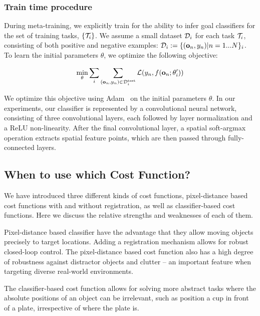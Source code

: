 \subsubsection{Train time procedure}

During meta-training, we explicitly train for the ability to infer goal classifiers for the set of training tasks, $\{ \mathcal{T}_i \}$. We assume a small dataset $\mathcal{D}_i$ for each task $\mathcal{T}_i$, consisting of both positive and negative examples: $\mathcal{D}_i:= \{(\mathbf{o}_n,y_n) | n=1...N \}_i$. To learn the initial parameters $\theta$, we optimize the following objective:

$$
\min_\theta \sum_i \sum_{(\mathbf{o}_n, y_n) \in \mathcal{D}^\text{test}_i} \mathcal{L}(y_n, f(\mathbf{o}_n; \theta_i')) 
$$

We optimize this objective using Adam~\cite{ADAM} on the initial parameters $\theta$. In our experiments, our classifier is represented by a convolutional neural network, consisting of three convolutional layers, each followed by layer normalization and a ReLU non-linearity. After the final convolutional layer, a spatial soft-argmax operation extracts spatial feature points, which are then passed through fully-connected layers.

\subsection{When to use which Cost Function?}
\label{subsec:cost_discuission}

We have introduced three different kinds of cost functions, pixel-distance based cost functions with and without registration, as well as classifier-based cost functions. Here we discuss the relative strengths and weaknesses of each of them.

Pixel-distance based classifier have the advantage that they allow moving objects precisely to target locations. Adding a registration mechanism allows for robust closed-loop control. The pixel-distance based cost function also has a high degree of robustness against distractor objects and clutter -- an important feature when targeting diverse real-world environments.

The classifier-based cost function allows for solving more abstract tasks where the absolute positions of an object can be irrelevant, such as position a cup in front of a plate, irrespective of where the plate is.
